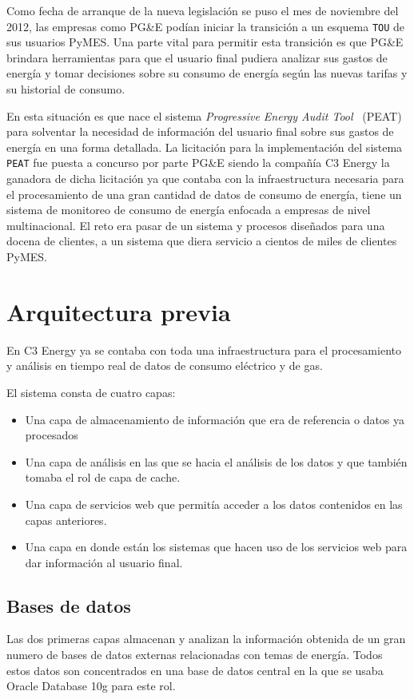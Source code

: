 Como fecha de arranque de la nueva legislación se puso el mes de noviembre del 2012,
las empresas como PG\&E podían iniciar la transición a un esquema \texttt{TOU}
de sus usuarios PyMES. Una parte vital para permitir esta transición es que
PG\&E brindara herramientas para que el usuario final pudiera analizar sus
gastos de energía y tomar decisiones sobre su consumo de energía según las
nuevas tarifas y su historial de consumo.

En esta situación es que nace el sistema \textit{Progressive
  Energy Audit Tool} \ (PEAT) para solventar la necesidad de información
del usuario final sobre sus gastos de energía en una forma detallada.
La licitación para la implementación del sistema \texttt{PEAT} fue puesta
a concurso por parte PG\&E siendo la compañía C3 Energy la ganadora de dicha
licitación  ya que contaba con la infraestructura necesaria para el
procesamiento de una gran cantidad de datos de consumo de energía,
tiene un sistema de monitoreo de consumo de energía enfocada a empresas de nivel
multinacional. El reto era pasar de un sistema y procesos diseñados
para una docena de clientes, a un sistema que diera servicio a
cientos de miles de clientes PyMES.

\section{Arquitectura previa}
En C3 Energy ya se contaba con toda una infraestructura para el
procesamiento y análisis en tiempo real de datos de consumo eléctrico
y de gas.

El sistema consta de cuatro capas:

\begin{itemize}
\item Una capa de almacenamiento de información que era de referencia
  o datos ya procesados
\item Una capa de análisis en las que se hacia el análisis de los datos
  y que también tomaba el rol de capa de cache.
\item Una capa de servicios web que permitía acceder a los datos contenidos
  en las capas anteriores.
\item Una capa en donde están los sistemas que hacen uso de los
  servicios web para dar información al usuario final.
\end{itemize}

\subsection{Bases de datos}
Las dos primeras capas almacenan y analizan la información obtenida
de un gran numero de bases de datos externas relacionadas con temas
de energía. Todos estos datos son concentrados en una base de datos
central en la que se usaba Oracle Database 10g para este rol.

